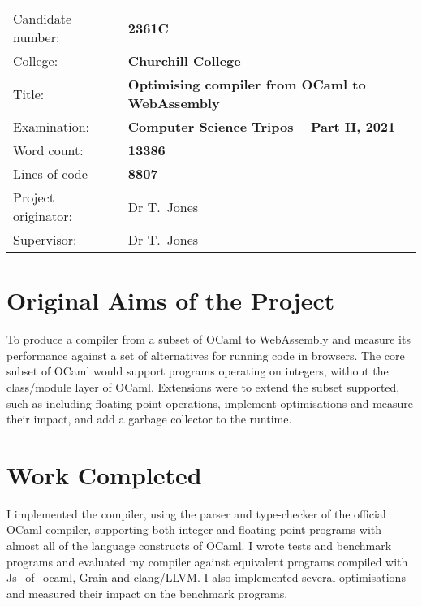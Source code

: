 \documentclass[a4paper,12pt,twoside]{report} %
\def\authorcollege{Churchill College\xspace}
\def\dissertationtitle{Optimising compiler from OCaml to WebAssembly}
\def\wordcount{13386} %
\begin{document}
{\large
\begin{tabular}{ll}
Candidate number:               & \bf {2361C}     \\
College:            & \bf\authorcollege     \\
Title:      & \bf\dissertationtitle \\
Examination:        & \bf Computer Science Tripos -- Part II, 2021  \\
Word count:         & \bf \wordcount \footnotemark[1] \\
Lines of code 	 & \bf {8807}\footnotemark[2] \\
Project originator: & Dr T.~Jones                    \\
Supervisor:         &  Dr T.~Jones                   \\ 
\end{tabular}
}

\section*{Original Aims of the Project}

To produce a compiler from a subset of OCaml to WebAssembly and measure its performance against a set of alternatives for running code in browsers. The core subset of OCaml would support programs operating on integers, without the class/module layer of OCaml. Extensions were to extend the subset supported, such as including floating point operations, implement optimisations and measure their impact, and add a garbage collector to the runtime.


\section*{Work Completed} %
I implemented the compiler, using the parser and type-checker of the official OCaml compiler, supporting both integer and floating point programs with almost all of the language constructs of OCaml. I wrote tests and benchmark programs and evaluated my compiler against equivalent programs compiled with Js\_of\_ocaml, Grain and clang/LLVM. I also implemented several optimisations and measured their impact on the benchmark programs.
\end{document}
